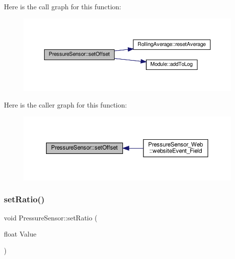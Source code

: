 Here is the call graph for this function\+:
\nopagebreak
\begin{figure}[H]
\begin{center}
\leavevmode
\includegraphics[width=350pt]{class_pressure_sensor_af4ea57467bb0d6ae89b0f1a65c7863da_cgraph}
\end{center}
\end{figure}
Here is the caller graph for this function\+:
\nopagebreak
\begin{figure}[H]
\begin{center}
\leavevmode
\includegraphics[width=350pt]{class_pressure_sensor_af4ea57467bb0d6ae89b0f1a65c7863da_icgraph}
\end{center}
\end{figure}
\mbox{\label{class_pressure_sensor_a5c46cbf770e053a41dad7ee63549ae7e}} 
\subsubsection{\texorpdfstring{set\+Ratio()}{setRatio()}\hspace{0.1cm}{\footnotesize\ttfamily [1/2]}}
{\footnotesize\ttfamily void Pressure\+Sensor\+::set\+Ratio (\begin{DoxyParamCaption}\item[{float}]{Value }\end{DoxyParamCaption})\hspace{0.3cm}{\ttfamily [protected]}}



